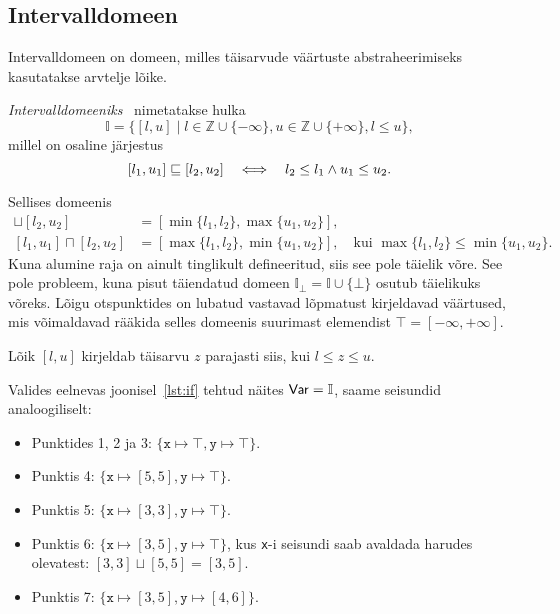\documentclass[../thesis.tex]{subfiles}
\begin{document}
\subsection{Intervalldomeen}
Intervalldomeen on domeen, milles täisarvude väärtuste abstraheerimiseks kasutatakse arvtelje lõike.

\begin{definition}
\emph{Intervalldomeeniks}~\cite[55]{seidl_foundations} nimetatakse hulka
\[
	\mathbb{I} = \{ [l, u] \mid l \in \mathbb{Z} \cup \{-\infty\}, u \in \mathbb{Z} \cup \{+\infty\}, l \leq u \},
\]
millel on osaline järjestus
\[
	[l_1, u_1] \sqsubseteq [l_2, u_2] \quad\Longleftrightarrow\quad l_2 \leq l_1 \land u_1 \leq u_2.
\]
\end{definition}

Sellises domeenis
\begin{align*}
	[l_1, u_1] \sqcup [l_2, u_2] &= [\min\{l_1, l_2\}, \max\{u_1, u_2\}], \\
	[l_1, u_1] \sqcap [l_2, u_2] &= [\max\{l_1, l_2\}, \min\{u_1, u_2\}],\quad \text{kui } \max\{l_1, l_2\} \leq \min\{u_1, u_2\}.
\end{align*}
Kuna alumine raja on ainult tinglikult defineeritud, siis see pole täielik võre. See pole probleem, kuna pisut täiendatud domeen $\mathbb{I}_\bot = \mathbb{I} \cup \{\bot\}$ osutub täielikuks võreks.
Lõigu otspunktides on lubatud vastavad lõpmatust kirjeldavad väärtused, mis võimaldavad rääkida selles domeenis suurimast elemendist $\top = [-\infty, +\infty]$.

Lõik $[l, u]$ kirjeldab täisarvu $z$ parajasti siis, kui $l \leq z \leq u$.

Valides eelnevas joonisel~\ref{lst:if} tehtud näites $\mathsf{Var} = \mathbb{I}$, saame seisundid analoogiliselt:
\begin{itemize}
	\item Punktides 1, 2 ja 3: $\{ \texttt{x} \mapsto \top, \texttt{y} \mapsto \top \}$.
	\item Punktis 4: $\{ \texttt{x} \mapsto [5, 5], \texttt{y} \mapsto \top \}$.
	\item Punktis 5: $\{ \texttt{x} \mapsto [3, 3], \texttt{y} \mapsto \top \}$.
	\item Punktis 6: $\{ \texttt{x} \mapsto [3, 5], \texttt{y} \mapsto \top \}$, kus \texttt{x}-i seisundi saab avaldada harudes olevatest: $[3, 3] \sqcup [5, 5] = [3, 5]$.
	\item Punktis 7: $\{ \texttt{x} \mapsto [3, 5], \texttt{y} \mapsto [4, 6] \}$.
\end{itemize}
\end{document}
